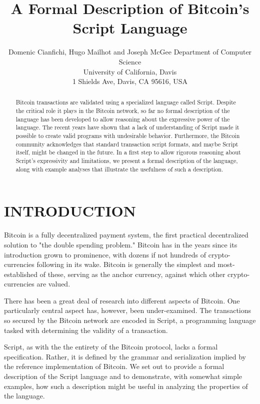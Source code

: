 \documentclass[letterpaper, 10 pt, conference]{ieeeconf}
\title{\LARGE \bf
A Formal Description of Bitcoin's Script Language
}
\author{ \parbox{4 in}{
                        \centering Domenic Cianfichi, Hugo Mailhot and Joseph McGee
                        Department of Computer Science\\
                        University of California, Davis\\
                        1 Shields Ave, Davis, CA 95616, USA
                      }
}
\begin{document}
\maketitle
\thispagestyle{empty}
\pagestyle{empty}


\begin{abstract}

Bitcoin transactions are validated using a specialized language called Script. Despite the critical role it plays in the Bitcoin network, so far no formal description of the language has been developed to allow reasoning about the expressive power of the language. The recent years have shown that a lack of understanding of Script made it possible to create valid programs with undesirable behavior. Furthermore, the Bitcoin community acknowledges that standard transaction script formats, and maybe Script itself, might be changed in the future. In a first step to allow rigorous reasoning about Script's expressivity and limitations, we present a formal description of the language, along with example analyses that illustrate the usefulness of such a description.

\end{abstract}


\section{INTRODUCTION}

Bitcoin is a fully decentralized payment system, the first practical decentralized solution to "the double spending problem." Bitcoin has in the years since its introduction grown to prominence, with dozens if not hundreds of crypto-currencies following in its wake. Bitcoin is generally the simplest and most-established of these, serving as the anchor currency, against which other crypto-currencies are valued.

There has been a great deal of research into different aspects of Bitcoin. One particularly central aspect has, however, been under-examined. The transactions so secured by the Bitcoin network are encoded in Script, a programming language tasked with determining the validity of a transaction.

Script, as with the the entirety of the Bitcoin protocol, lacks a formal specification. Rather, it is defined by the grammar and serialization implied by the reference implementation of Bitcoin. We set out to provide a formal description of the Script language and to demonstrate, with somewhat simple examples, how such a description might be useful in analyzing the properties of the language.
\end{document}
